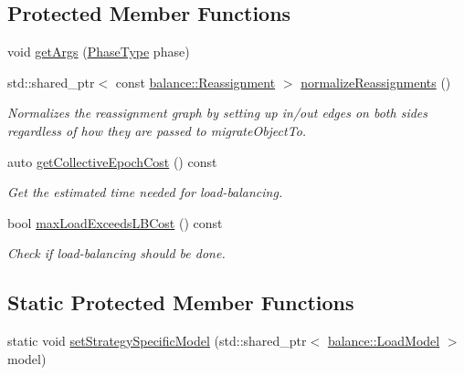 \subsection*{Protected Member Functions}
\begin{DoxyCompactItemize}
\item 
void \hyperlink{structvt_1_1vrt_1_1collection_1_1lb_1_1_base_l_b_a4ec045a3c6231d055b6e851de3016bba}{get\+Args} (\hyperlink{namespacevt_a46ce6733d5cdbd735d561b7b4029f6d7}{Phase\+Type} phase)
\item 
std\+::shared\+\_\+ptr$<$ const \hyperlink{structvt_1_1vrt_1_1collection_1_1balance_1_1_reassignment}{balance\+::\+Reassignment} $>$ \hyperlink{structvt_1_1vrt_1_1collection_1_1lb_1_1_base_l_b_a9ecdb512cc5a87d637e48ab8d5b49b43}{normalize\+Reassignments} ()
\begin{DoxyCompactList}\small\item\em Normalizes the reassignment graph by setting up in/out edges on both sides regardless of how they are passed to {\ttfamily migrate\+Object\+To}. \end{DoxyCompactList}\item 
auto \hyperlink{structvt_1_1vrt_1_1collection_1_1lb_1_1_base_l_b_a01c7d1aaf1bd806249f3ea0f2ebf19f6}{get\+Collective\+Epoch\+Cost} () const
\begin{DoxyCompactList}\small\item\em Get the estimated time needed for load-\/balancing. \end{DoxyCompactList}\item 
bool \hyperlink{structvt_1_1vrt_1_1collection_1_1lb_1_1_base_l_b_a5ec697fdb24de2be20a754086d156d8f}{max\+Load\+Exceeds\+L\+B\+Cost} () const
\begin{DoxyCompactList}\small\item\em Check if load-\/balancing should be done. \end{DoxyCompactList}\end{DoxyCompactItemize}
\subsection*{Static Protected Member Functions}
\begin{DoxyCompactItemize}
\item 
static void \hyperlink{structvt_1_1vrt_1_1collection_1_1lb_1_1_base_l_b_abe5e30efbdb728854de25beb605189ae}{set\+Strategy\+Specific\+Model} (std\+::shared\+\_\+ptr$<$ \hyperlink{structvt_1_1vrt_1_1collection_1_1balance_1_1_load_model}{balance\+::\+Load\+Model} $>$ model)
\end{DoxyCompactItemize}
